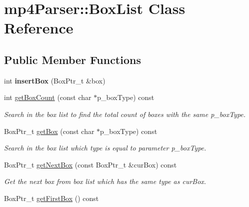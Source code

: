 \hypertarget{classmp4_parser_1_1_box_list}{}\section{mp4\+Parser\+::Box\+List Class Reference}
\label{classmp4_parser_1_1_box_list}
\subsection*{Public Member Functions}
\begin{DoxyCompactItemize}
\item 
\mbox{\label{classmp4_parser_1_1_box_list_a8b2c7394dd94d6605d300dc3bf8e2c0c}} 
int {\bfseries insert\+Box} (Box\+Ptr\+\_\+t \&box)
\item 
int \mbox{\hyperlink{classmp4_parser_1_1_box_list_ac8f02d0f68e98f348019268127eba98a}{get\+Box\+Count}} (const char $\ast$p\+\_\+box\+Type) const
\begin{DoxyCompactList}\small\item\em Search in the box list to find the total count of boxes with the same p\+\_\+box\+Type. \end{DoxyCompactList}\item 
Box\+Ptr\+\_\+t \mbox{\hyperlink{classmp4_parser_1_1_box_list_a0cb719a35dca3955405798beb065c7ce}{get\+Box}} (const char $\ast$p\+\_\+box\+Type) const
\begin{DoxyCompactList}\small\item\em Search in the box list which type is equal to parameter p\+\_\+box\+Type. \end{DoxyCompactList}\item 
\mbox{\label{classmp4_parser_1_1_box_list_a5b8ac5b56e5f900d9edf44927303b016}} 
Box\+Ptr\+\_\+t \mbox{\hyperlink{classmp4_parser_1_1_box_list_a5b8ac5b56e5f900d9edf44927303b016}{get\+Next\+Box}} (const Box\+Ptr\+\_\+t \&cur\+Box) const
\begin{DoxyCompactList}\small\item\em Get the next box from box list which has the same type as cur\+Box. \end{DoxyCompactList}\item 
\mbox{\label{classmp4_parser_1_1_box_list_ab0ab35c6ac6c8ee8ae5aa511142c6734}} 
Box\+Ptr\+\_\+t \mbox{\hyperlink{classmp4_parser_1_1_box_list_ab0ab35c6ac6c8ee8ae5aa511142c6734}{get\+First\+Box}} () const

\end{DoxyCompactItemize}
